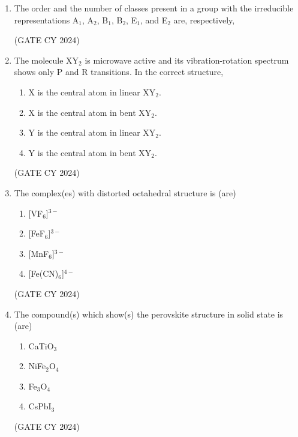 \documentclass[12pt]{article}
\begin{document}
\begin{enumerate}
\item The order and the number of classes present in a group with the irreducible representations A$_1$, A$_2$, B$_1$, B$_2$, E$_1$, and E$_2$ are, respectively,

\begin{enumerate}
\end{enumerate}
\hfill (GATE CY 2024)

\item The molecule XY$_2$ is microwave active and its vibration-rotation spectrum shows only P and R transitions. In the correct structure,

\begin{enumerate}
\item X is the central atom in linear XY$_2$.
\item X is the central atom in bent XY$_2$.
\item Y is the central atom in linear XY$_2$.
\item Y is the central atom in bent XY$_2$.
\end{enumerate}
\hfill (GATE CY 2024)

\item The complex(es) with distorted octahedral structure is (are)
\begin{multicols}{2}
\begin{enumerate}
\item {[VF$_6$]}$^{3-}$
\item {[FeF$_6$]}$^{3-}$
\item {[MnF$_6$]}$^{3-}$
\item {[Fe(CN)$_6$]}$^{4-}$
\end{enumerate}
\end{multicols}
\hfill (GATE CY 2024)

\item The compound(s) which show(s) the perovskite structure in solid state is (are)

\begin{enumerate}
\item CaTiO$_3$
\item NiFe$_2$O$_4$
\item Fe$_3$O$_4$
\item CsPbI$_3$
\end{enumerate}
\hfill (GATE CY 2024)


\end{enumerate}
\end{document}
